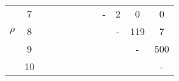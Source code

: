 \begin{table}[phtb!]
\begin{tabular}{cccccccccccc}
                         & 7  &   &                          &                          &                          &                          &                          & -                         & {\color[HTML]{32CB00} 2} & {\color[HTML]{32CB00} 0} & {\color[HTML]{32CB00} 0} \\
\multirow{-8}{*}{$\rho$} & 8  &   &                          &                          &                          &                          &                          &                           & -                        & 119                      & {\color[HTML]{32CB00} 7} \\
                         & 9  &   &                          &                          &                          &                          &                          &                           &                          & -                        & 500                      \\
                         & 10 &   &                          &                          &                          &                          &                          &                           &                          &                          & -                        \\ \hline
\end{tabular}
\label{tab:tabela1}
\end{table}
